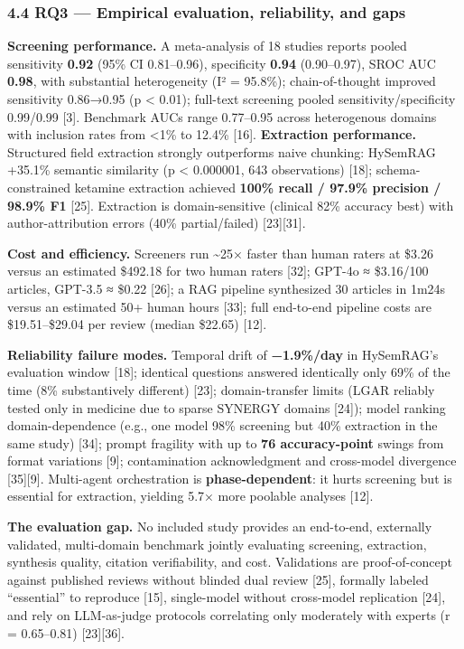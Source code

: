 \documentclass[11pt]{article}
\begin{document}
\subsubsection{4.4 RQ3 --- Empirical evaluation, reliability, and
gaps}\label{rq3-empirical-evaluation-reliability-and-gaps}

\textbf{Screening performance.} A meta-analysis of 18 studies reports
pooled sensitivity \textbf{0.92} (95\% CI 0.81--0.96), specificity
\textbf{0.94} (0.90--0.97), SROC AUC \textbf{0.98}, with substantial
heterogeneity (I² = 95.8\%); chain-of-thought improved sensitivity
0.86→0.95 (p \textless{} 0.01); full-text screening pooled
sensitivity/specificity 0.99/0.99 {[}3{]}. Benchmark AUCs range
0.77--0.95 across heterogenous domains with inclusion rates from
\textless1\% to 12.4\% {[}16{]}. \textbf{Extraction performance.}
Structured field extraction strongly outperforms naive chunking:
HySemRAG +35.1\% semantic similarity (p \textless{} 0.000001, 643
observations) {[}18{]}; schema-constrained ketamine extraction achieved
\textbf{100\% recall / 97.9\% precision / 98.9\% F1} {[}25{]}.
Extraction is domain-sensitive (clinical 82\% accuracy best) with
author-attribution errors (40\% partial/failed) {[}23{]}{[}31{]}.

\textbf{Cost and efficiency.} Screeners run \textasciitilde25× faster
than human raters at \$3.26 versus an estimated \$492.18 for two human
raters {[}32{]}; GPT-4o ≈ \$3.16/100 articles, GPT-3.5 ≈ \$0.22
{[}26{]}; a RAG pipeline synthesized 30 articles in 1m24s versus an
estimated 50+ human hours {[}33{]}; full end-to-end pipeline costs are
\$19.51--\$29.04 per review (median \$22.65) {[}12{]}.

\textbf{Reliability failure modes.} Temporal drift of
\textbf{−1.9\%/day} in HySemRAG's evaluation window {[}18{]}; identical
questions answered identically only 69\% of the time (8\% substantively
different) {[}23{]}; domain-transfer limits (LGAR reliably tested only
in medicine due to sparse SYNERGY domains {[}24{]}); model ranking
domain-dependence (e.g., one model 98\% screening but 40\% extraction in
the same study) {[}34{]}; prompt fragility with up to \textbf{76
accuracy-point} swings from format variations {[}9{]}; contamination
acknowledgment and cross-model divergence {[}35{]}{[}9{]}. Multi-agent
orchestration is \textbf{phase-dependent}: it hurts screening but is
essential for extraction, yielding 5.7× more poolable analyses {[}12{]}.

\textbf{The evaluation gap.} No included study provides an end-to-end,
externally validated, multi-domain benchmark jointly evaluating
screening, extraction, synthesis quality, citation verifiability, and
cost. Validations are proof-of-concept against published reviews without
blinded dual review {[}25{]}, formally labeled ``essential'' to
reproduce {[}15{]}, single-model without cross-model replication
{[}24{]}, and rely on LLM-as-judge protocols correlating only moderately
with experts (r = 0.65--0.81) {[}23{]}{[}36{]}.
\end{document}
